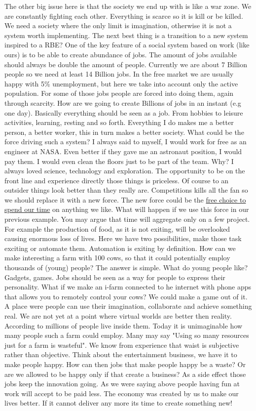 \documentclass{article}
\begin{document}
The other big issue here is that the society we end up with is like a war zone.
We are constantly fighting each other.
Everything is scarce so it is kill or be killed.
We need a society where the only limit is imagination, otherwise it is not a system worth implementing.
The next best thing is a transition to a new system inspired to a RBE?
One of the key feature of a social system based on work (like ours) is to be able to create abundance of jobs.
The amount of jobs available should always be double the amount of people.
Currently we are about 7 Billion people so we need at least 14 Billion jobs.
In the free market we are usually happy with 5\% unemployment, but here we take into account only the active population.
For some of those jobs people are forced into doing them, again through scarcity.
How are we going to create Billions of jobs in an instant (e.g one day).
Basically everything should be seen as a job.
From hobbies to leisure activities, learning, resting and so forth.
Everything I do makes me a better person, a better worker, this in turn makes a better society.
What could be the force driving such a system?
I always said to myself, I would work for free as an engineer at NASA.
Even better if they gave me an astronaut position, I would pay them.
I would even clean the floors just to be part of the team.
Why?
I always loved science, technology and exploration.
The opportunity to be on the front line and experience directly those things is priceless.
Of course to an outsider things look better than they really are.
Competitions kills all the fan so we should replace it with a new force.
The new force could be the \underline{free choice to spend our time} on anything we like.
What will happen if we use this force in our previous example.
You may argue that time will aggregate only on a few project.
For example the production of food, as it is not exiting, will be overlooked causing enormous loss of lives.
Here we have two possibilities, make those task exciting or automate them.
Automation is exiting by definition.
How can we make interesting a farm with 100 cows, so that it could potentially employ thousands of (young) people?
The answer is simple.
What do young people like?
Gadgets, games.
Jobs should be seen as a way for people to express their personality.
What if we make an i-farm connected to he internet with phone apps that allows you to remotely control your cows?
We could make a game out of it.
A place were people can use their imagination, collaborate and achieve something real.
We are not yet at a point where virtual worlds are better then reality.
According to \cite{gaming} millions of people live inside them.
Today it is unimaginable how many people such a farm could employ.
Many may say "Using so many resources just for a farm is wasteful".
We know from experience that waist is subjective rather than objective.
Think about the entertainment business, we have it to make people happy.
How can then jobs that make people happy be a waste?
Or are we allowed to be happy only if that create a business?
As a side effect those jobs keep the innovation going.
As we were saying above people having fun at work will accept to be paid less.
The economy was created by us to make our lives better.
If it cannot deliver any more its time to create something new!
\end{document}
